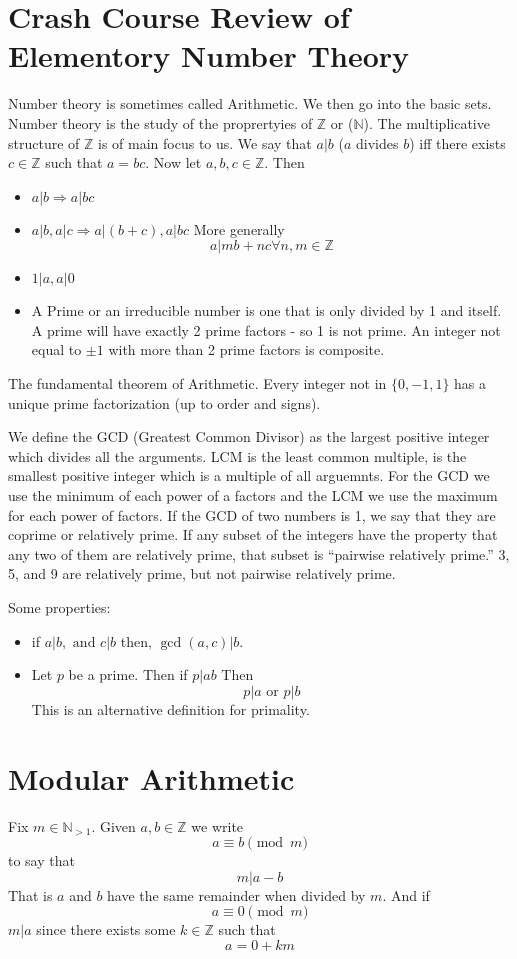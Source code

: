\documentclass{article}
\begin{document}
\section{Crash Course Review of Elementory Number Theory}
Number theory is sometimes called Arithmetic. We then go into the basic sets.
Number theory is the study of the proprertyies of $\mathbb{Z}$ or
($\mathbb{N}$). The multiplicative structure of $\mathbb{Z}$ is of main focus to
us. We say that $a|b$ ($a$ divides $b$) iff there exists $c \in \mathbb{Z}$ such
that $ a = bc$. Now let $a,b,c \in \mathbb{Z}$. Then
\begin{itemize}
\item $a|b \Rightarrow a | bc$
\item $a|b, a|c \Rightarrow a|(b+c), a|bc$
More generally 
\[ a| mb + nc \forall n,m \in \mathbb{Z} \]
\item $1 | a, a | 0$
\item A Prime or an irreducible number is one that is only divided by 1 and
itself. A prime will have exactly 2 prime factors - so 1 is not prime. An
integer not equal to $\pm 1$ with more than 2 prime factors is composite.
\end{itemize}
The fundamental theorem of Arithmetic. Every integer not in $\{0,-1,1\}$ has a
unique prime factorization (up to order and signs). 

We define the GCD (Greatest Common Divisor) as the largest positive integer
which divides all the arguments. LCM is the least common multiple, is the
smallest positive integer which is a multiple of all arguemnts. For the GCD we
use the minimum of each power of a factors and the LCM we use the maximum for
each power of factors. If the GCD of two numbers is 1, we say that they are
coprime or relatively prime. If any subset of the integers have the property
that any two of them are relatively prime, that subset is ``pairwise relatively
prime.'' 3, 5, and 9 are relatively prime, but not pairwise relatively prime. 

Some properties: 
\begin{itemize}
\item if $a|b, \text{ and } c|b$ then, $\gcd(a,c)|b$.
\item Let $p$ be a prime. Then if $p|ab$ Then
\[ p | a \text{ or } p | b \]
This is an alternative definition for primality. 
\end{itemize}

\section{Modular Arithmetic}
Fix $m \in \mathbb{N}_{>1}$. Given $a,b \in \mathbb{Z}$ we write 
\[ a \equiv b \pmod m \] 
to say that
\[ m | a - b \]
That is $a$ and $b$ have the same remainder when divided by $m$. And if 
\[ a \equiv 0 \pmod m \]
$m | a$ since there exists some $k \in \mathbb{Z}$ such that
\[ a = 0 + km \]
\end{document}
